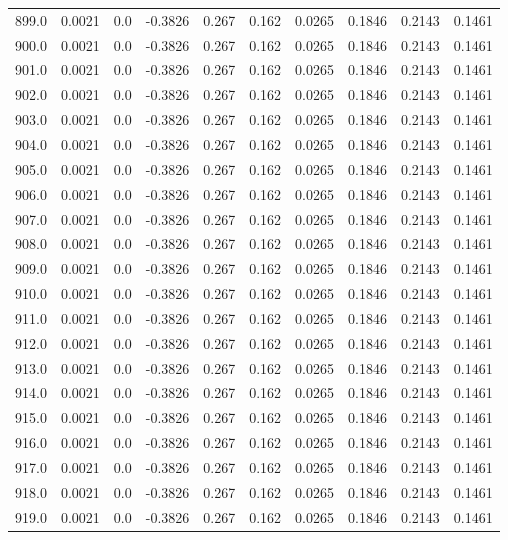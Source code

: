 \begin{longtable}{lrrrrrrrrr}
899.0 & 0.0021 & 0.0 & -0.3826 & 0.267 & 0.162 & 0.0265 & 0.1846 & 0.2143 & 0.1461 \\
900.0 & 0.0021 & 0.0 & -0.3826 & 0.267 & 0.162 & 0.0265 & 0.1846 & 0.2143 & 0.1461 \\
901.0 & 0.0021 & 0.0 & -0.3826 & 0.267 & 0.162 & 0.0265 & 0.1846 & 0.2143 & 0.1461 \\
902.0 & 0.0021 & 0.0 & -0.3826 & 0.267 & 0.162 & 0.0265 & 0.1846 & 0.2143 & 0.1461 \\
903.0 & 0.0021 & 0.0 & -0.3826 & 0.267 & 0.162 & 0.0265 & 0.1846 & 0.2143 & 0.1461 \\
904.0 & 0.0021 & 0.0 & -0.3826 & 0.267 & 0.162 & 0.0265 & 0.1846 & 0.2143 & 0.1461 \\
905.0 & 0.0021 & 0.0 & -0.3826 & 0.267 & 0.162 & 0.0265 & 0.1846 & 0.2143 & 0.1461 \\
906.0 & 0.0021 & 0.0 & -0.3826 & 0.267 & 0.162 & 0.0265 & 0.1846 & 0.2143 & 0.1461 \\
907.0 & 0.0021 & 0.0 & -0.3826 & 0.267 & 0.162 & 0.0265 & 0.1846 & 0.2143 & 0.1461 \\
908.0 & 0.0021 & 0.0 & -0.3826 & 0.267 & 0.162 & 0.0265 & 0.1846 & 0.2143 & 0.1461 \\
909.0 & 0.0021 & 0.0 & -0.3826 & 0.267 & 0.162 & 0.0265 & 0.1846 & 0.2143 & 0.1461 \\
910.0 & 0.0021 & 0.0 & -0.3826 & 0.267 & 0.162 & 0.0265 & 0.1846 & 0.2143 & 0.1461 \\
911.0 & 0.0021 & 0.0 & -0.3826 & 0.267 & 0.162 & 0.0265 & 0.1846 & 0.2143 & 0.1461 \\
912.0 & 0.0021 & 0.0 & -0.3826 & 0.267 & 0.162 & 0.0265 & 0.1846 & 0.2143 & 0.1461 \\
913.0 & 0.0021 & 0.0 & -0.3826 & 0.267 & 0.162 & 0.0265 & 0.1846 & 0.2143 & 0.1461 \\
914.0 & 0.0021 & 0.0 & -0.3826 & 0.267 & 0.162 & 0.0265 & 0.1846 & 0.2143 & 0.1461 \\
915.0 & 0.0021 & 0.0 & -0.3826 & 0.267 & 0.162 & 0.0265 & 0.1846 & 0.2143 & 0.1461 \\
916.0 & 0.0021 & 0.0 & -0.3826 & 0.267 & 0.162 & 0.0265 & 0.1846 & 0.2143 & 0.1461 \\
917.0 & 0.0021 & 0.0 & -0.3826 & 0.267 & 0.162 & 0.0265 & 0.1846 & 0.2143 & 0.1461 \\
918.0 & 0.0021 & 0.0 & -0.3826 & 0.267 & 0.162 & 0.0265 & 0.1846 & 0.2143 & 0.1461 \\
919.0 & 0.0021 & 0.0 & -0.3826 & 0.267 & 0.162 & 0.0265 & 0.1846 & 0.2143 & 0.1461 \\

\end{longtable}
